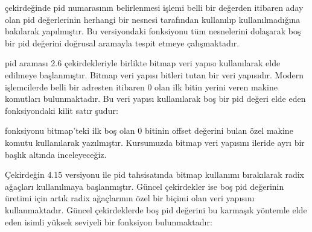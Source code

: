 \documentclass[a4paper,10pt,turkish]{sphinxmanual}
\begin{document}
 çekirdeğinde pid numarasının belirlenmesi işlemi belli bir değerden itibaren aday olan pid değerlerinin
herhangi bir  nesnesi tarafından kullanılıp kullanılmadığına bakılarak yapılmıştır. Bu
versiyondaki  fonksiyonu tüm  nesnelerini dolaşarak boş bir pid değerini doğrusal
aramayla tespit etmeye çalışmaktadır.

\sphinxAtStartPar
pid araması 2.6 çekirdekleriyle birlikte bitmap veri yapısı kullanılarak elde edilmeye başlanmıştır.
Bitmap veri yapısı bitleri tutan bir veri yapısıdır. Modern işlemcilerde belli bir adresten itibaren 0
olan ilk bitin yerini veren makine komutları bulunmaktadır. Bu veri yapısı kullanılarak boş bir pid
değeri elde eden fonksiyondaki kilit satır şudur:

\begin{sphinxVerbatim}[commandchars=\\\{\}]
\end{sphinxVerbatim}

\sphinxAtStartPar
{} fonksiyonu bitmap’teki ilk boş olan 0 bitinin offset değerini bulan özel makine komutu
kullanılarak yazılmıştır. Kursumuzda bitmap veri yapısını ileride ayrı bir başlık altında inceleyeceğiz.

\sphinxAtStartPar
Çekirdeğin 4.15 versiyonu ile pid tahsisatında bitmap kullanımı bırakılarak radix ağaçları kullanılmaya
başlanmıştır. Güncel çekirdekler ise boş pid değerinin üretimi için artık radix ağaçlarının özel bir
biçimi olan  veri yapısını kullanmaktadır. Güncel çekirdeklerde boş pid değerini bu karmaşık
yöntemle elde eden  isimli yüksek seviyeli bir fonksiyon bulunmaktadır:

\begin{sphinxVerbatim}[commandchars=\\\{\}]
\end{sphinxVerbatim}
\end{document}

